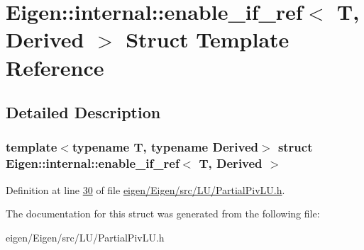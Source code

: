 \hypertarget{struct_eigen_1_1internal_1_1enable__if__ref}{}\section{Eigen\+:\+:internal\+:\+:enable\+\_\+if\+\_\+ref$<$ T, Derived $>$ Struct Template Reference}
\label{struct_eigen_1_1internal_1_1enable__if__ref}


\subsection{Detailed Description}
\subsubsection*{template$<$typename T, typename Derived$>$\newline
struct Eigen\+::internal\+::enable\+\_\+if\+\_\+ref$<$ T, Derived $>$}



Definition at line \hyperlink{eigen_2_eigen_2src_2_l_u_2_partial_piv_l_u_8h_source_l00030}{30} of file \hyperlink{eigen_2_eigen_2src_2_l_u_2_partial_piv_l_u_8h_source}{eigen/\+Eigen/src/\+L\+U/\+Partial\+Piv\+L\+U.\+h}.



The documentation for this struct was generated from the following file\+:\begin{DoxyCompactItemize}
\item 
eigen/\+Eigen/src/\+L\+U/\+Partial\+Piv\+L\+U.\+h\end{DoxyCompactItemize}
